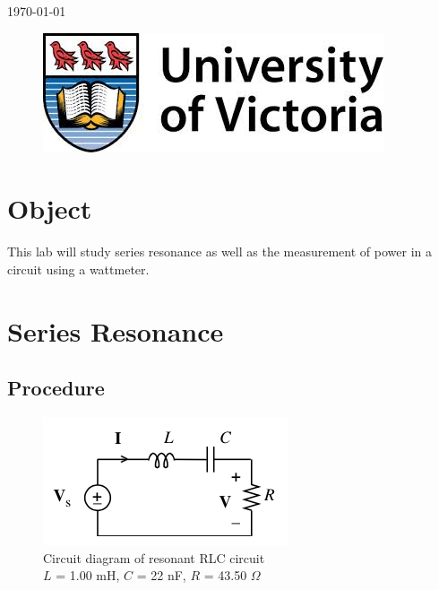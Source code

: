 \documentclass[12pt]{article}
\begin{document}
\begin{titlepage}
{\large \today}\\ %

\begin{figure}[b]	 %
	\centering
	\includegraphics[scale=0.3]{UVic_logo}
\end{figure}

\end{titlepage}





\section{Object}\label{sec:object}
This lab will study series resonance as well as the measurement of power in a circuit using a wattmeter.

\section{Series Resonance}\label{sec:resonance}
\subsection{Procedure}\label{sec:res_procedure}
\begin{figure}[h]
	\centering
	\includegraphics[scale=0.75]{resonance_diagram}
	\caption{Circuit diagram of resonant RLC circuit \\ $L$ = 1.00 mH, $C$ = 22 nF, $R$ = 43.50 $\Omega$}
	\label{fig:res_diagram}
\end{figure}
\end{document}
